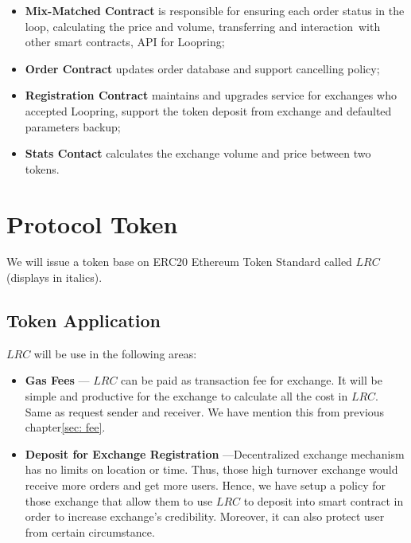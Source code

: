 \documentclass[UTF8,nofonts]{article}
\begin{document}
\begin{itemize}
 \item \textbf{Mix-Matched Contract} is responsible for ensuring each order status in the loop,  calculating the price and volume,  transferring and interaction with other smart contracts,  API for Loopring;
 \item  \textbf{Order Contract} updates order database and support cancelling policy;
 \item \textbf{Registration Contract} maintains and upgrades service for exchanges who accepted Loopring,  support the token deposit from exchange and defaulted parameters backup;
 \item \textbf{Stats Contact} calculates the exchange volume and price between two tokens.

\end{itemize}

\section{Protocol Token \label{sec: protocoltoken}}


We will issue a token base on ERC20 Ethereum Token Standard called $LRC$ (displays in italics).


\subsection{Token Application}

$LRC$ will be use in the following areas:

\begin{itemize}
 \item \textbf{Gas Fees} --- $LRC$ can be paid as transaction fee for exchange. It will be simple and productive for the exchange to calculate all the cost in $LRC$. Same as request sender and receiver. We have mention this from previous chapter\ref{sec: fee}.
 \item \textbf{Deposit for Exchange Registration} ---Decentralized exchange mechanism has no limits on location or time. Thus,  those high turnover exchange would receive more orders and get more users. Hence,  we have setup a policy for those exchange that allow them to use $LRC$ to deposit into smart contract in order to increase exchange's credibility. Moreover,  it can also protect user from certain circumstance.
\end{itemize}
\end{document}
